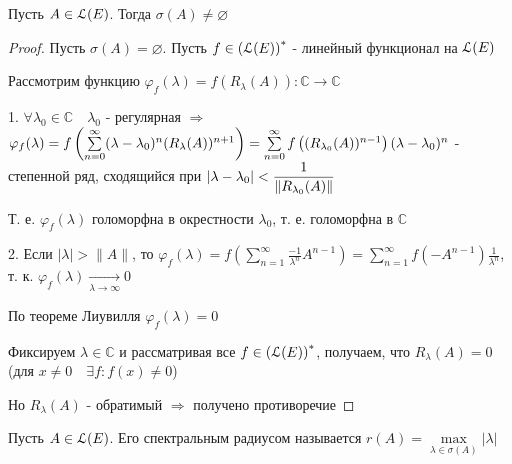 \documentclass[a4paper,12pt]{report}
\newcommand*{\hm}[1]{#1\nobreak\discretionary{}%
            {\hbox{$\mathsurround=0pt #1$}}{}}
\begin{document}
\begin{thm}
Пусть $A\in\EuScript L(E)$. Тогда $\sigma(A)\ne\varnothing$
\end{thm}
\begin{proof}
Пусть $\sigma(A)=\varnothing$. Пусть $f\in\left(\EuScript L(E)\right)^*$ - линейный функционал на $\EuScript L(E)$

Рассмотрим функцию $\varphi_f(\lambda)=f(R_\lambda(A))\colon\mathbb C\to\mathbb C$

1. $\forall\lambda_0\in\mathbb C\quad\lambda_0$ - регулярная $\Rightarrow$ $\varphi_f(\lambda)=f\left(\sum\limits_{n=0}^\infty(\lambda-\lambda_0)^n(R_{\lambda}(A))^{n+1}\right)\hm=\sum\limits_{n=0}^\infty f\left((R_{\lambda_0}(A))^{n-1}\right)(\lambda-\lambda_0)^n$ - степенной ряд, сходящийся при $|\lambda-\lambda_0|\hm<\displaystyle\frac{1}{\|R_{\lambda_0}(A)\|}$

Т. е. $\varphi_f(\lambda)$ голоморфна в окрестности $\lambda_0$, т. е. голоморфна в $\mathbb C$

2. Если $|\lambda|>\|A\|$, то $\varphi_f(\lambda)=f\left(\sum\limits_{n=1}^\infty\displaystyle\frac{-1}{\lambda^n}A^{n-1}\right)=\sum\limits_{n=1}^\infty f(-A^{n-1})\displaystyle\frac{1}{\lambda^n}$, т. к. $\varphi_f(\lambda)\xrightarrow[\lambda\to\infty]{}0$

По теореме Лиувилля $\varphi_f(\lambda)=0$

Фиксируем $\lambda\in\mathbb C$ и рассматривая все $f\in\left(\EuScript L(E)\right)^*$, получаем, что ${R_\lambda(A)=0}$ (для $x\ne0\quad\exists f\colon f(x)\ne0$)

Но $R_\lambda(A)$ - обратимый $\Rightarrow$ получено противоречие
\end{proof}
 


\begin{df}
Пусть $A\in\EuScript L(E)$. Его спектральным радиусом называется $r(A)=\max\limits_{\lambda\in\sigma(A)}|\lambda|$
\end{df}
 
\end{document}
